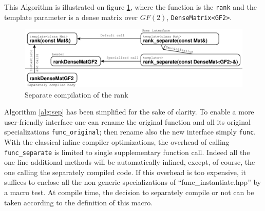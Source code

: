 \documentclass[runningheads,a4paper]{llncs}
\begin{document}
This Algorithm is illustrated on figure \ref{fig:sep}, where
the function is the \texttt{rank} and the template parameter is a dense
matrix over $GF(2)$,
\texttt{DenseMatrix<GF2>}.
\vspace{-10pt}\begin{figure}[ht]
\includegraphics[width=\textwidth]{separate}\vspace{-10pt}
\caption{Separate compilation of the rank}\label{fig:sep}
\end{figure}\vspace{-10pt}

%
  Algorithm \ref{alg:sep} has been simplified for the
  sake of clarity. To enable a more user-friendly interface one can
  rename the original function and all its 
  original specializations \texttt{func\_original}; then rename also
  the new interface
 simply \texttt{func}. 
%
With the classical inline compiler optimizations, the overhead of
calling \texttt{func\_separate} is limited to single supplementary
function call. Indeed all the one line additional methods will be
automatically inlined, except, of course, the one calling the separately
compiled code.
If this overhead is too expensive, it suffices to enclose all the non generic specializations of
``func\_instantiate.hpp'' by a macro test. 
At compile time, the decision to separately
compile or not can be taken according to the definition of this
macro. 
\end{document}
